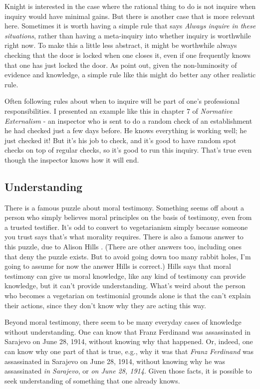 \documentclass[
  11pt,
]{book}
\begin{document}
Knight is interested in the case where the rational thing to do is not inquire when inquiry would have minimal gains. But there is another case that is more relevant here. Sometimes it is worth having a simple rule that says \emph{Always inquire in these situations}, rather than having a meta-inquiry into whether inquiry is worthwhile right now. To make this a little less abstract, it might be worthwhile always checking that the door is locked when one closes it, even if one frequently knows that one has just locked the door. As \citet{HawthorneSrinivasan2013} point out, given the non-luminosity of evidence and knowledge, a simple rule like this might do better any other realistic rule.

Often following rules about when to inquire will be part of one's professional responsibilities. I presented an example like this in chapter 7 of \emph{Normative Externalism} - an inspector who is sent to do a random check of an establishment he had checked just a few days before. He knows everything is working well; he just checked it! But it's his job to check, and it's good to have random spot checks on top of regular checks, so it's good to run this inquiry. That's true even though the inspector knows how it will end.

\hypertarget{understandinginquiry}{%
\subsection{Understanding}\label{understandinginquiry}}

There is a famous puzzle about moral testimony. Something seems off about a person who simply believes moral principles on the basis of testimony, even from a trusted testifier. It's odd to convert to vegetarianism simply because someone you trust says that's what morality requires. There is also a famous answer to this puzzle, due to Alison Hills \citeyearpar{Hills2009}. (There are other answers too, including ones that deny the puzzle exists. But to avoid going down too many rabbit holes, I'm going to assume for now the answer Hills is correct.) Hills says that moral testimony can give us moral knowledge, like any kind of testimony can provide knowledge, but it can't provide understanding. What's weird about the person who becomes a vegetarian on testimonial grounds alone is that the can't explain their actions, since they don't know why they are acting this way.

Beyond moral testimony, there seem to be many everyday cases of knowledge without understanding. One can know that Franz Ferdinand was assassinated in Sarajevo on June 28, 1914, without knowing why that happened. Or, indeed, one can know why one part of that is true, e.g., why it was that \emph{Franz Ferdinand} was assassinated in Sarajevo on June 28, 1914, without knowing why he was assassinated \emph{in Sarajevo}, or \emph{on June 28, 1914}. Given those facts, it is possible to seek understanding of something that one already knows.
\end{document}
